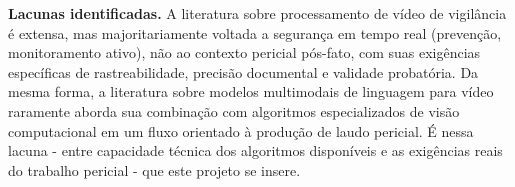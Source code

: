 \textbf{Lacunas identificadas.} A literatura sobre processamento de vídeo de vigilância é extensa, mas majoritariamente voltada a segurança em tempo real (prevenção, monitoramento ativo), não ao contexto pericial pós-fato, com suas exigências específicas de rastreabilidade, precisão documental e validade probatória. Da mesma forma, a literatura sobre modelos multimodais de linguagem para vídeo raramente aborda sua combinação com algoritmos especializados de visão computacional em um fluxo orientado à produção de laudo pericial. É nessa lacuna - entre capacidade técnica dos algoritmos disponíveis e as exigências reais do trabalho pericial - que este projeto se insere.
